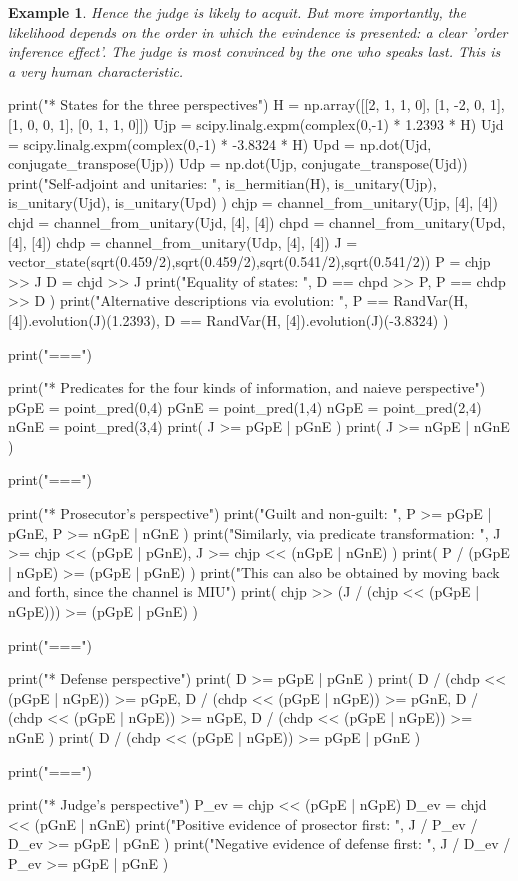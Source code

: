\documentclass[leqno]{tufte-book} %
\newtheorem{example}[theorem]{Example}
\begin{document}
{\begin{example}
\noindent Hence the judge is likely to acquit. But more importantly,
the likelihood depends on the order in which the evindence is
presented: a clear 'order inference effect'. The judge is most
convinced by the one who speaks last. This is a very human
characteristic.
\end{example}

    print("* States for the three perspectives")
    H = np.array([[2, 1, 1, 0],
                  [1, -2, 0, 1],
                  [1, 0, 0, 1],
                  [0, 1, 1, 0]])
    Ujp = scipy.linalg.expm(complex(0,-1) * 1.2393 * H)
    Ujd = scipy.linalg.expm(complex(0,-1) * -3.8324 * H)
    Upd = np.dot(Ujd, conjugate_transpose(Ujp))
    Udp = np.dot(Ujp, conjugate_transpose(Ujd))
    print("Self-adjoint and unitaries: ",
          is_hermitian(H), is_unitary(Ujp), is_unitary(Ujd), is_unitary(Upd) )
    chjp = channel_from_unitary(Ujp, [4], [4])
    chjd = channel_from_unitary(Ujd, [4], [4])
    chpd = channel_from_unitary(Upd, [4], [4])
    chdp = channel_from_unitary(Udp, [4], [4])
    J = vector_state(sqrt(0.459/2),sqrt(0.459/2),sqrt(0.541/2),sqrt(0.541/2))
    P = chjp >> J
    D = chjd >> J
    print("Equality of states: ", D == chpd >> P, P == chdp >> D )
    print("Alternative descriptions via evolution: ",
          P == RandVar(H, [4]).evolution(J)(1.2393),
          D == RandVar(H, [4]).evolution(J)(-3.8324) )

    print("\n===\n")

    print("* Predicates for the four kinds of information, and naieve perspective")
    pGpE = point_pred(0,4)
    pGnE = point_pred(1,4)
    nGpE = point_pred(2,4)
    nGnE = point_pred(3,4)
    print( J >= pGpE | pGnE )
    print( J >= nGpE | nGnE )

    print("\n===\n")

    print("* Prosecutor's perspective")
    print("Guilt and non-guilt: ", P >= pGpE | pGnE, P >= nGpE | nGnE )
    print("Similarly, via predicate transformation: ",
          J >= chjp << (pGpE | pGnE), J >= chjp << (nGpE | nGnE) )
    print( P / (pGpE | nGpE) >= (pGpE | pGnE) )
    print("This can also be obtained by moving back and forth, since the channel is MIU")
    print( chjp >> (J / (chjp << (pGpE | nGpE))) >= (pGpE | pGnE) )

    print("\n===\n")

    print("* Defense perspective")
    print( D >= pGpE | pGnE )
    print( D / (chdp << (pGpE | nGpE)) >= pGpE, 
           D / (chdp << (pGpE | nGpE)) >= pGnE,
           D / (chdp << (pGpE | nGpE)) >= nGpE,
           D / (chdp << (pGpE | nGpE)) >= nGnE )
    print( D / (chdp << (pGpE | nGpE)) >= pGpE | pGnE )

    print("\n===\n")

    print("* Judge's perspective")
    P_ev = chjp << (pGpE | nGpE)
    D_ev = chjd << (pGnE | nGnE)
    print("Positive evidence of prosector first: ",
          J / P_ev / D_ev >= pGpE | pGnE )
    print("Negative evidence of defense first: ",
          J / D_ev / P_ev >= pGpE | pGnE )

}
\end{document}
